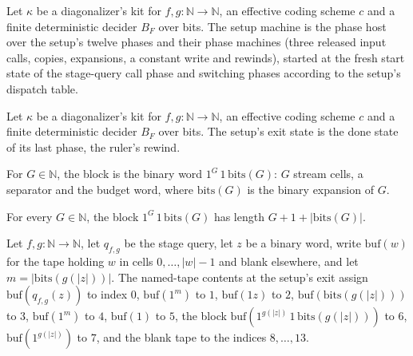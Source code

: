 \begin{definition}
\label{Turing.NTimeDiag.dzSet}
\leanok
{}
Let $\kappa$ be a diagonalizer's kit for $f, g : \mathbb{N} \to \mathbb{N}$, an effective coding scheme $c$ and a finite deterministic decider $B_F$ over bits. The setup machine is the phase host over the setup's twelve phases and their phase machines (three released input calls, copies, expansions, a constant write and rewinds), started at the fresh start state of the stage-query call phase and switching phases according to the setup's dispatch table.
\end{definition}

\begin{definition}
\label{Turing.NTimeDiag.dzPexit}
\leanok
{}
Let $\kappa$ be a diagonalizer's kit for $f, g : \mathbb{N} \to \mathbb{N}$, an effective coding scheme $c$ and a finite deterministic decider $B_F$ over bits. The setup's exit state is the done state of its last phase, the ruler's rewind.
\end{definition}

\begin{definition}
\label{Turing.NTimeDiag.dzBlk}
\leanok
For $G \in \mathbb{N}$, the block is the binary word $1^G\,1\,\mathrm{bits}(G)$: $G$ stream cells, a separator and the budget word, where $\mathrm{bits}(G)$ is the binary expansion of $G$.
\end{definition}

\begin{theorem}
\label{Turing.NTimeDiag.dzBlk_length}
\leanok
{}
For every $G \in \mathbb{N}$, the block $1^G\,1\,\mathrm{bits}(G)$ has length $G + 1 + |\mathrm{bits}(G)|$.
\end{theorem}

\begin{definition}
\label{Turing.NTimeDiag.dzSetL}
\leanok
{}
Let $f, g : \mathbb{N} \to \mathbb{N}$, let $q_{f,g}$ be the stage query, let $z$ be a binary word, write $\mathrm{buf}(w)$ for the tape holding $w$ in cells $0, \dots, |w| - 1$ and blank elsewhere, and let $m = |\mathrm{bits}(g(|z|))|$. The named-tape contents at the setup's exit assign $\mathrm{buf}(q_{f,g}(z))$ to index $0$, $\mathrm{buf}(1^m)$ to $1$, $\mathrm{buf}(1z)$ to $2$, $\mathrm{buf}(\mathrm{bits}(g(|z|)))$ to $3$, $\mathrm{buf}(1^m)$ to $4$, $\mathrm{buf}(1)$ to $5$, the block $\mathrm{buf}(1^{g(|z|)}\,1\,\mathrm{bits}(g(|z|)))$ to $6$, $\mathrm{buf}(1^{g(|z|)})$ to $7$, and the blank tape to the indices $8, \dots, 13$.
\end{definition}


